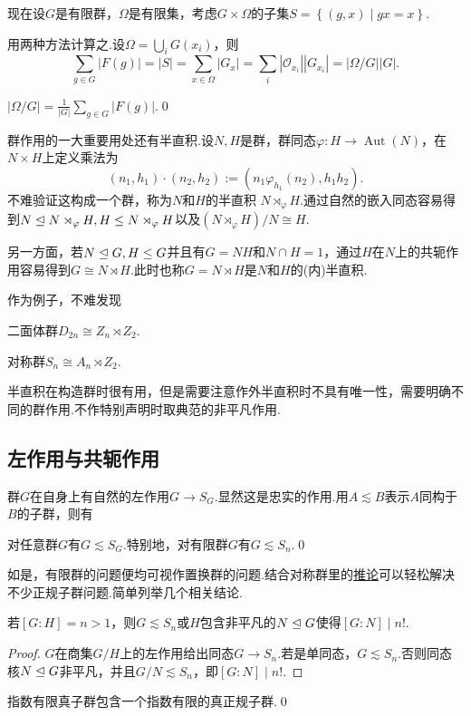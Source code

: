 现在设$G$是有限群，$\Omega$是有限集，考虑$G\times\Omega$的子集$S=\left\{(g,x)\mid gx=x\right\}$.

用两种方法计算之.设$\Omega=\bigcup_i G(x_i)$，则
\[
	\sum_{g\in G}|F(g)|=|S|=\sum_{x\in\Omega}|G_x|=\sum_i|\mathcal{O}_{x_i}||G_{x_i}|=|\Omega/G||G|.
\]
\begin{thm}[(Burnside引理)]
	$\displaystyle|\Omega/G|=\frac{1}{|G|}\sum_{g\in G}|F(g)|$.\qed
\end{thm}

群作用的一大重要用处还有\hypertarget{text:Semidirect}{半直积}.设$N,H$是群，群同态$\varphi\colon H\to\operatorname*{Aut}(N)$，在$N\times H$上定义乘法为
\[
	(n_1,h_1)\cdot(n_2,h_2):=(n_1\varphi_{h_1}(n_2),h_1h_2).
\]
不难验证这构成一个群，称为$N$和$H$的{\heiti 半直积} $N\rtimes_\varphi H$.通过自然的嵌入同态容易得到$N\trianglelefteq N\rtimes_\varphi H,H\le N\rtimes_\varphi H$以及$(N\rtimes_\varphi H)/N\cong H$.

另一方面，若$N\trianglelefteq G,H\le G$并且有$G=NH$和$N\cap H=1$，通过$H$在$N$上的共轭作用容易得到$G\cong N\rtimes H$.此时也称$G=N\rtimes H$是$N$和$H$的{\heiti (内)半直积}.

作为例子，不难发现
\par\begin{itemize*}
	\item 二面体群$D_{2n}\cong Z_n\rtimes Z_2$.\phantom{\qquad}
	\item 对称群$S_n\cong A_n\rtimes Z_2$.
\end{itemize*}\par
\medskip 半直积在构造群时很有用，但是需要注意作外半直积时不具有唯一性，需要明确不同的群作用.不作特别声明时取典范的非平凡作用.

\subsection{左作用与共轭作用}
群$G$在自身上有自然的左作用$G\to S_G$.显然这是忠实的作用.用$A\lesssim B$表示$A$同构于$B$的子群，则有
\begin{thm}[(Cayley)]
	对任意群$G$有$G\lesssim S_G$.特别地，对有限群$G$有$G\lesssim S_n$.\qed\hypertarget{thm:Cayley}{}
\end{thm}

如是，有限群的问题便均可视作置换群的问题.结合对称群里的\hyperlink{cor:Index2Permutation}{推论}可以轻松解决不少正规子群问题.简单列举几个相关结论.
\begin{prop}
	若$[G:H]=n>1$，则$G\lesssim S_n$\footnotemark 或$H$包含非平凡的$N\trianglelefteq G$使得$[G:N]\mid n!$.
\end{prop}
\begin{proof}
	$G$在商集$G/H$上的左作用给出同态$G\to S_n$.若是单同态，$G\lesssim S_n$.否则同态核$N\trianglelefteq G$非平凡，并且$G/N\lesssim S_n$，即$[G:N]\mid n!$.
\end{proof}
\begin{cor*}
	指数有限真子群包含一个指数有限的真正规子群.\qed
\end{cor*}

